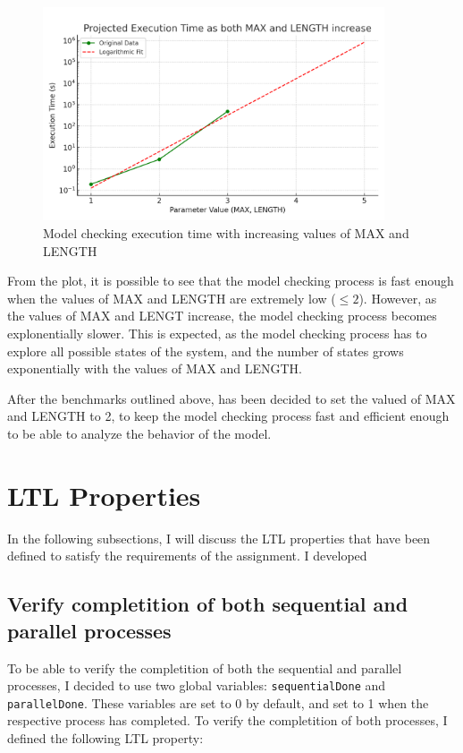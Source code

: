\documentclass[a4paper, 11pt]{article}
\begin{document}
\begin{figure}[H]
	\centering
	\includegraphics[width=0.9\textwidth]{./images/max_len_increase_exec_time.png}
	\caption{Model checking execution time with increasing values of MAX and LENGTH}
	\label{fig:all_execution_time}
\end{figure}

From the plot, it is possible to see that the model checking process is fast enough when the values of MAX and LENGTH are extremely low ($\leq 2$). However, as the values of MAX and LENGT increase, the model checking process becomes explonentially slower. This is expected, as the model checking process has to explore all possible states of the system, and the number of states grows exponentially with the values of MAX and LENGTH.

After the benchmarks outlined above, has been decided to set the valued of MAX and LENGTH to 2, to keep the model checking process fast and efficient enough to be able to analyze the behavior of the model.

\section{LTL Properties}
\label{sec:ltl}

In the following subsections, I will discuss the LTL properties that have been defined to satisfy the requirements of the assignment. I developed

\subsection{Verify completition of both sequential and parallel processes}

To be able to verify the completition of both the sequential and parallel processes, I decided to use two global variables: \texttt{sequentialDone} and \texttt{parallelDone}. These variables are set to 0 by default, and set to 1 when the respective process has completed. To verify the completition of both processes, I defined the following LTL property:
\end{document}
